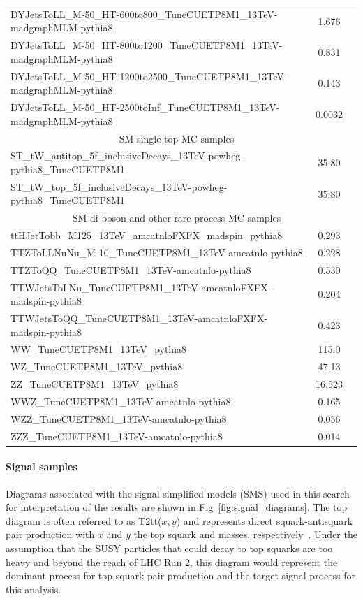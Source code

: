 \begin{table}[hp]
{\begin{tabular}{lcc}
DYJetsToLL\_M-50\_HT-600to800\_TuneCUETP8M1\_13TeV-madgraphMLM-pythia8 & 1.676 \\
DYJetsToLL\_M-50\_HT-800to1200\_TuneCUETP8M1\_13TeV-madgraphMLM-pythia8 & 0.831 \\
DYJetsToLL\_M-50\_HT-1200to2500\_TuneCUETP8M1\_13TeV-madgraphMLM-pythia8 & 0.143 \\
DYJetsToLL\_M-50\_HT-2500toInf\_TuneCUETP8M1\_13TeV-madgraphMLM-pythia8 & 0.0032 \\
\hline
\multicolumn{2}{c}{SM single-top MC samples} \\ \hline
ST\_tW\_antitop\_5f\_inclusiveDecays\_13TeV-powheg-pythia8\_TuneCUETP8M1 & 35.80\\
ST\_tW\_top\_5f\_inclusiveDecays\_13TeV-powheg-pythia8\_TuneCUETP8M1 & 35.80\\
\hline
\multicolumn{2}{c}{SM di-boson and other rare process MC samples} \\ \hline
ttHJetTobb\_M125\_13TeV\_amcatnloFXFX\_madspin\_pythia8 & 0.293 \\
TTZToLLNuNu\_M-10\_TuneCUETP8M1\_13TeV-amcatnlo-pythia8 & 0.228 \\
TTZToQQ\_TuneCUETP8M1\_13TeV-amcatnlo-pythia8 & 0.530 \\
TTWJetsToLNu\_TuneCUETP8M1\_13TeV-amcatnloFXFX-madspin-pythia8 & 0.204 \\
TTWJetsToQQ\_TuneCUETP8M1\_13TeV-amcatnloFXFX-madspin-pythia8 & 0.423 \\
WW\_TuneCUETP8M1\_13TeV\_pythia8 & 115.0 \\
WZ\_TuneCUETP8M1\_13TeV\_pythia8 & 47.13 \\
ZZ\_TuneCUETP8M1\_13TeV\_pythia8 & 16.523 \\
WWZ\_TuneCUETP8M1\_13TeV-amcatnlo-pythia8 & 0.165 \\
WZZ\_TuneCUETP8M1\_13TeV-amcatnlo-pythia8 & 0.056 \\
ZZZ\_TuneCUETP8M1\_13TeV-amcatnlo-pythia8 & 0.014 \\
\hline \hline
\end{tabular}
}
\end{table}

\paragraph{Signal samples}

Diagrams associated with the signal simplified models (SMS) used in this search for interpretation of the results are shown in Fig~\ref{fig:signal_diagrams}. The top diagram is often referred to as T2tt($x,y$) and represents direct squark-antisquark pair production with $x$ and $y$ the top squark and \chiOneZero masses, respectively~\cite{CMS-SMS-paper}. Under the assumption that the SUSY particles that could decay to top squarks are too heavy and beyond the reach of LHC Run 2, this diagram would represent the dominant process for top squark pair production and the target signal process for this analysis.

